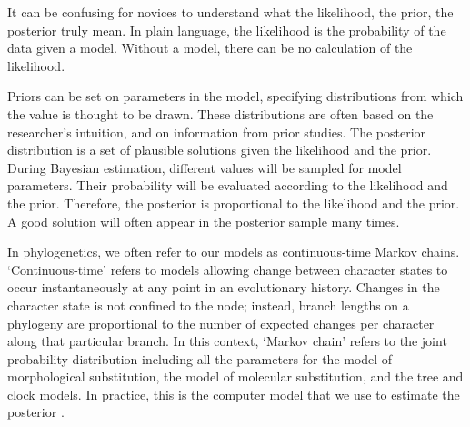 \documentclass[11pt]{article}
\makeatletter
\newenvironment{boxedtext}[1]{%
  \begin{mdframed}[frametitle=#1,
    frametitlefont=\scshape\mdseries\sffamily,
    frametitlealignment=\centering,
    backgroundcolor=black!20,
    hidealllines=true,
    innerleftmargin=11\p@,innerrightmargin=11\p@,
    frametitleaboveskip=0.5\baselineskip,
    innerbottommargin=0.5\baselineskip,
    skipabove=\baselineskip,skipbelow=0.5\baselineskip]
}{%
  \end{mdframed}%
}
\makeatother
\begin{document}
\begin{boxedtext}{The likelihood, the prior, and the posterior}

It can be confusing for novices to understand what the likelihood, the prior, the posterior truly mean.
In plain language, the likelihood is the probability of the data given a model.
Without a model, there can be no calculation of the likelihood.

Priors can be set on parameters in the model, specifying distributions from which the value is thought to be drawn.
These distributions are often based on the researcher's intuition, and on information from prior studies.
The posterior distribution is a set of plausible solutions given the likelihood and the prior.
During Bayesian estimation, different values will be sampled for model parameters.
Their probability will be evaluated according to the likelihood and the prior.
Therefore, the posterior is proportional to the likelihood and the prior.
A good solution will often appear in the posterior sample many times.

In phylogenetics, we often refer to our models as continuous-time Markov chains.
`Continuous-time' refers to models allowing change between character states to occur instantaneously at any point in an evolutionary history.
Changes in the character state is not confined to the node; instead, branch lengths on a phylogeny are proportional to the number of expected changes per character along that particular branch. 
In this context, `Markov chain' refers to the  joint probability distribution including all the parameters for the model of morphological substitution, the model of molecular substitution, and the tree and clock models. 
In practice, this is the computer model that we use to estimate the posterior \cite{Hoehna2016b}.
\end{boxedtext}
\end{document}
